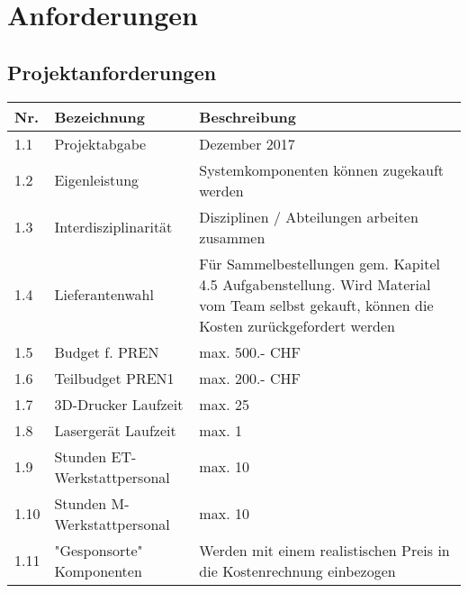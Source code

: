 \documentclass[a4paper]{report}
\begin{document}
\chapter{Anforderungen}
\section{Projektanforderungen}
\begin{tabular}{|l|l|l|}
	\hline 
	\textbf{Nr.} & \textbf{Bezeichnung} & \textbf{Beschreibung} \\ 
	\hline 
	1.1 & Projektabgabe & Dezember 2017 \\ 
	\hline 
	1.2 & Eigenleistung & Systemkomponenten können zugekauft werden \\ 
	\hline
	1.3 & Interdisziplinarität & Disziplinen / Abteilungen arbeiten zusammen \\
	\hline
	1.4 & Lieferantenwahl & Für Sammelbestellungen gem. Kapitel 4.5 Aufgabenstellung. Wird Material vom Team selbst gekauft, können die Kosten zurückgefordert werden \\ 
	\hline 
	1.5 & Budget f. PREN & max. 500.- CHF \\ 
	\hline 
	1.6 & Teilbudget PREN1 & max. 200.- CHF \\ 
	\hline 
	1.7 & 3D-Drucker Laufzeit & max. 25 \\ 
	\hline 
	1.8 & Lasergerät Laufzeit & max. 1 \\ 
	\hline 
	1.9 & Stunden ET-Werkstattpersonal & max. 10 \\ 
	\hline 
	1.10 & Stunden M-Werkstattpersonal & max. 10 \\ 
	\hline 
	1.11 & "Gesponsorte" Komponenten & Werden mit einem realistischen Preis in die Kostenrechnung einbezogen \\
	\hline
\end{tabular} 
\end{document}
